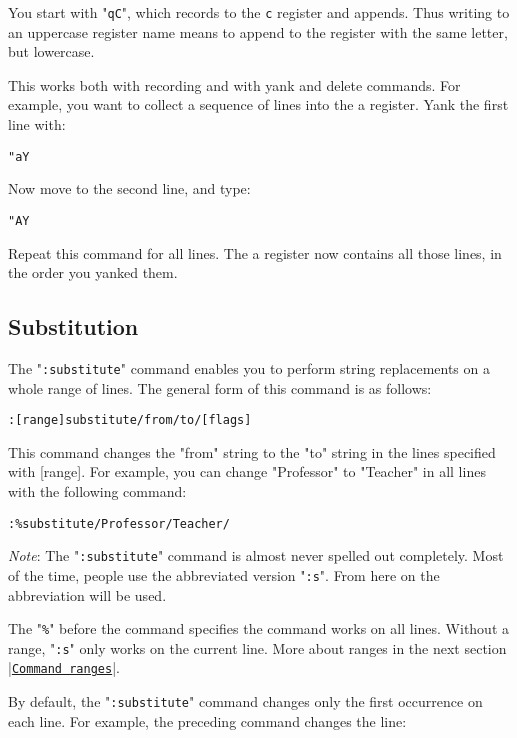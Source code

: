 You start with "\texttt{qC}", which records to the \texttt{c} register and appends.
Thus writing to an uppercase register name means to append to the register with the same letter, but lowercase.

This works both with recording and with yank and delete commands.
For example, you want to collect a sequence of lines into the a register.
Yank the first line with:

\begin{Verbatim}[samepage=true]
 "aY
\end{Verbatim}

Now move to the second line, and type:

\begin{Verbatim}[samepage=true]
 "AY
\end{Verbatim}

Repeat this command for all lines.
The a register now contains all those lines, in the order you yanked them.

\subsection{Substitution}
\label{find-replace}
The "\texttt{:substitute}" command enables you to perform string replacements on a whole range of lines.
The general form of this command is as follows:

\begin{Verbatim}[samepage=true]
 :[range]substitute/from/to/[flags]
\end{Verbatim}

This command changes the "from" string to the "to" string in the lines specified with [range].
For example, you can change "Professor" to "Teacher" in all lines with the following command:

\begin{Verbatim}[samepage=true]
 :%substitute/Professor/Teacher/
\end{Verbatim}
 
\emph{Note}: The "\texttt{:substitute}" command is almost never spelled out completely.
Most of the time, people use the abbreviated version "\texttt{:s}".
From here on the abbreviation will be used.

The "\texttt{\%}" before the command specifies the command works on all lines.
Without a range, "\texttt{:s}" only works on the current line.
More about ranges in the next section |\hyperref[Command ranges]{\texttt{Command ranges}}|.

By default, the "\texttt{:substitute}" command changes only the first occurrence on each line.
For example, the preceding command changes the line:

